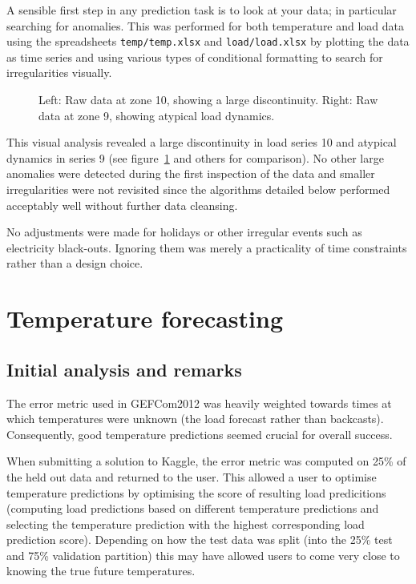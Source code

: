 \label{sec:cleans}

A sensible first step in any prediction task is to look at your data; in particular searching for anomalies.
This was performed for both temperature and load data using the spreadsheets \texttt{temp/temp.xlsx} and \texttt{load/load.xlsx} by plotting the data as time series and using various types of conditional formatting to search for irregularities visually.

\begin{figure}[ht]
  \begin{center}
    
  \end{center}
  \caption{Left: Raw data at zone 10, showing a large discontinuity. Right: Raw data at zone 9, showing atypical load dynamics.}
  \label{fig:load}
\end{figure}

This visual analysis revealed a large discontinuity in load series 10 and atypical dynamics in series 9 (see figure~\ref{fig:load} and others for comparison).
No other large anomalies were detected during the first inspection of the data and smaller irregularities were not revisited since the algorithms detailed below performed acceptably well without further data cleansing.

No adjustments were made for holidays or other irregular events such as electricity black-outs.
Ignoring them was merely a practicality of time constraints rather than a design choice.

\section{Temperature forecasting}

\label{sec:temp}

\subsection{Initial analysis and remarks}

The error metric used in GEFCom2012 was heavily weighted towards times at which temperatures were unknown (\ie the load forecast rather than backcasts).
Consequently, good temperature predictions seemed crucial for overall success.

When submitting a solution to Kaggle, the error metric was computed on 25\% of the held out data and returned to the user.
This allowed a user to optimise temperature predictions by optimising the score of resulting load predicitions (\ie computing load predictions based on different temperature predictions and selecting the temperature prediction with the highest corresponding load prediction score).
Depending on how the test data was split (into the 25\% test and 75\% validation partition) this may have allowed users to come very close to knowing the true future temperatures.

